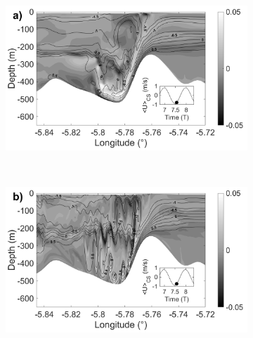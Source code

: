 \begin{figure}[!h]
  
  \begin{subfigure}{0.5\linewidth}
  \includegraphics[width=\textwidth]{./papier2D/RV_75T_ref.png}
  \end{subfigure}
  ~
  \begin{subfigure}{0.5\linewidth}
  \includegraphics[width=\textwidth]{./papier2D/RV_75T_50m.png}
  \end{subfigure}
  

\end{figure}
